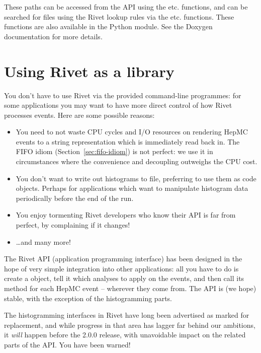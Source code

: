 \documentclass{JHEP3}
\begin{document}
These paths can be accessed from the API using the
 etc. functions, and can be searched for files
using the Rivet lookup rules via the 
etc. functions. These functions are also available in the Python 
module. See the Doxygen documentation for more details.



\section{Using Rivet as a library}

You don't have to use Rivet via the provided command-line programmes: for some
applications you may want to have more direct control of how Rivet processes
events. Here are some possible reasons:
%
\begin{itemize}
\item You need to not waste CPU cycles and I/O resources on rendering HepMC
  events to a string representation which is immediately read back in. The FIFO
  idiom (Section~\ref{sec:fifo-idiom}) is not perfect: we use it in circumstances
  where the convenience and decoupling outweighs the CPU cost.
\item You don't want to write out histograms to file, preferring to use them as
  code objects. Perhaps for applications which want to manipulate histogram data
  periodically before the end of the run.
\item You enjoy tormenting Rivet developers who know their API is far from
  perfect, by complaining if it changes!
\item \dots and many more!
\end{itemize}

The Rivet API (application programming interface) has been designed in the hope
of very simple integration into other applications: all you have to do is create
a  object, tell it which analyses to apply on the
events, and then call its  method for each HepMC event --
wherever they come from. The API is (we hope) stable, with the exception of the
histogramming parts.

\begin{warning}
  The histogramming interfaces in Rivet have long been advertised as marked for
  replacement, and while progress in that area has lagger far behind our
  ambitions, it \emph{will} happen before the 2.0.0 release, with unavoidable
  impact on the related parts of the API. You have been warned!
\end{warning}
\end{document}

